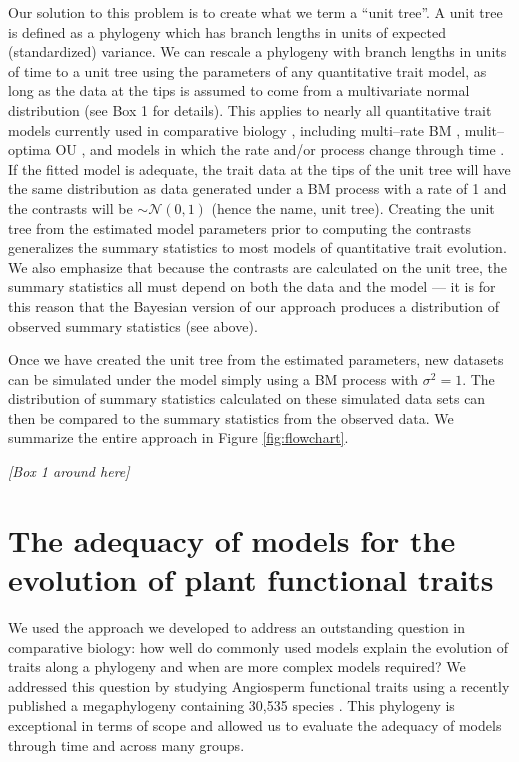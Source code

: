 \documentclass[a4paper,12pt]{article}
\begin{document}
Our solution to this problem is to create what we term a ``unit tree''. A unit tree is defined as a phylogeny which has branch lengths in units of expected (standardized) variance. We can rescale a phylogeny with branch lengths in units of time to a unit tree using the parameters of any quantitative trait model, as long as the data at the tips is assumed to come from a multivariate normal distribution (see Box 1 for details). This applies to nearly all quantitative trait models currently used in comparative biology \citep{Omeara2012}, including multi--rate BM \citep{Omeara2006, Eastman2011}, mulit--optima OU \citep{ButlerKing2004, Beaulieu2012, UyedaBayou}, and models in which the rate and/or process change through time \citep{Blomberg2003, SlaterMEE}. If the fitted model is adequate, the trait data at the tips of the unit tree will have the same distribution as data generated under a BM process with a rate of 1 and the contrasts will be $\sim \mathcal{N}(0,1)$ (hence the name, unit tree). Creating the unit tree from the estimated model parameters prior to computing the contrasts generalizes the summary statistics to most models of quantitative trait evolution. We also emphasize that because the contrasts are calculated on the unit tree, the summary statistics all must depend on both the data and the model --- it is for this reason that the Bayesian version of our approach produces a distribution of observed summary statistics (see above).

Once we have created the unit tree from the estimated parameters, new datasets can be simulated under the model simply using a BM process with $\sigma^2 = 1$. The distribution of summary statistics calculated on these simulated data sets can then be compared to the summary statistics from the observed data. We summarize the entire approach in Figure \ref{fig:flowchart}.

\begin{center}
\textit{[Box 1 around here]}
\end{center}

\section{The adequacy of models for the evolution of plant functional traits}

We used the approach we developed to address an outstanding question in comparative biology: how well do commonly used models explain the evolution of traits along a phylogeny and when are more complex models required? We addressed this question by studying Angiosperm functional traits using a recently published a megaphylogeny containing 30,535 species \citep{Zanne2013}. This phylogeny is exceptional in terms of scope and allowed us to evaluate the adequacy of models through time and across many groups.  
\end{document}
